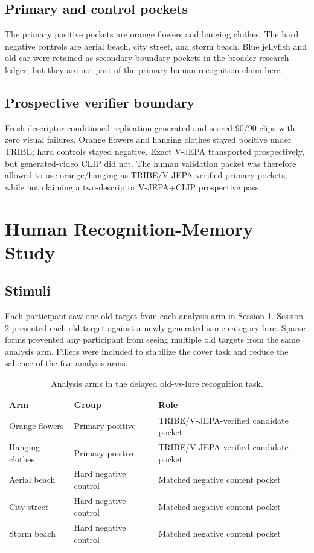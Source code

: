 \documentclass[11pt]{article}
\begin{document}
\subsection{Primary and control pockets}

The primary positive pockets are orange flowers and hanging clothes. The hard
negative controls are aerial beach, city street, and storm beach. Blue jellyfish
and old car were retained as secondary boundary pockets in the broader research
ledger, but they are not part of the primary human-recognition claim here.

\subsection{Prospective verifier boundary}

Fresh descriptor-conditioned replication generated and scored 90/90 clips with
zero visual failures. Orange flowers and hanging clothes stayed positive under
TRIBE; hard controls stayed negative. Exact V-JEPA transported prospectively,
but generated-video CLIP did not. The human validation packet was therefore
allowed to use orange/hanging as TRIBE/V-JEPA-verified primary pockets, while
not claiming a two-descriptor V-JEPA+CLIP prospective pass.

\section{Human Recognition-Memory Study}

\subsection{Stimuli}

Each participant saw one old target from each analysis arm in Session 1.
Session 2 presented each old target against a newly generated same-category
lure. Sparse forms prevented any participant from seeing multiple old targets
from the same analysis arm. Fillers were included to stabilize the cover task
and reduce the salience of the five analysis arms.

\begin{table}[t]
\centering
\caption{Analysis arms in the delayed old-vs-lure recognition task.}
\begin{tabular}{lll}
\toprule
Arm & Group & Role \\
\midrule
Orange flowers & Primary positive & TRIBE/V-JEPA-verified candidate pocket \\
Hanging clothes & Primary positive & TRIBE/V-JEPA-verified candidate pocket \\
Aerial beach & Hard negative control & Matched negative content pocket \\
City street & Hard negative control & Matched negative content pocket \\
Storm beach & Hard negative control & Matched negative content pocket \\
\bottomrule
\end{tabular}
\end{table}
\end{document}
